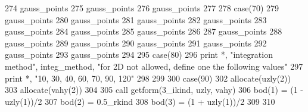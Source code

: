 \begin{DoxyCode}
{{{{{{{{{{{{{{{{{{274 \textcolor{comment}{              gauss_points%
275 \textcolor{comment}{              gauss_points%
276 \textcolor{comment}{              gauss_points%
277 \textcolor{comment}{}
278 \textcolor{comment}{            }\textcolor{keywordflow}{case}(70)
279               gauss_points%
280 \textcolor{comment}{              gauss_points%
281 \textcolor{comment}{              gauss_points%
282 \textcolor{comment}{              gauss_points%
283 \textcolor{comment}{              gauss_points%
284 \textcolor{comment}{              gauss_points%
285 \textcolor{comment}{              gauss_points%
286 \textcolor{comment}{}
287 \textcolor{comment}{              gauss_points%
288 \textcolor{comment}{              gauss_points%
289 \textcolor{comment}{              gauss_points%
290 \textcolor{comment}{              gauss_points%
291 \textcolor{comment}{              gauss_points%
292 \textcolor{comment}{              gauss_points%
293 \textcolor{comment}{              gauss_points%
294 \textcolor{comment}{}
295 \textcolor{comment}{            }\textcolor{keywordflow}{case}(80)
296               print *, \textcolor{stringliteral}{"integration method"}, integ_method,   \textcolor{stringliteral}{"for 2D not allowed, define one the following
       values"}
297               print *, \textcolor{stringliteral}{"10, 30, 40, 60, 70, 90, 120"}
298 
299 
300             \textcolor{keywordflow}{case}(90)
302               \textcolor{keyword}{allocate}(uzly(2))
303               \textcolor{keyword}{allocate}(vahy(2))
304 
305               \textcolor{keyword}{call }getform(3\_ikind, uzly, vahy)
306               bod(1) = (1 - uzly(1))/2
307               bod(2) = 0.5\_rkind
308               bod(3) = (1 + uzly(1))/2
309 
310               
}}}}}}}}}}}}}}}}}}}}}}}}}}}}}}}}}}
\end{DoxyCode}
